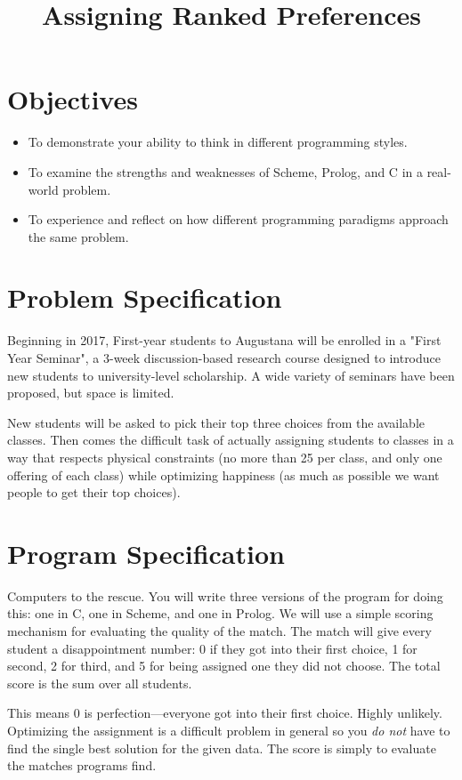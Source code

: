 \documentclass[12pt,info]{asg}
\title{Assigning Ranked Preferences}
\begin{document}
\maketitle
\section*{Objectives}
\begin{itemize}
\item To demonstrate your ability to think in different programming styles.
\item To examine the strengths and weaknesses of Scheme, Prolog, and C in a real-world problem.
\item To experience and reflect on how different programming paradigms approach the same problem.
\end{itemize}

\section*{Problem Specification}
Beginning in 2017, First-year students to Augustana will be enrolled in a "First Year Seminar", a 3-week discussion-based research course designed to introduce new students to university-level scholarship. A wide variety of seminars have been proposed, but space is limited.

New students will be asked to pick their top three choices from the available classes. Then comes the difficult task of actually assigning students to classes in a way that respects physical constraints (no more than 25 per class, and only one offering of each class) while optimizing happiness (as much as possible we want people to get their top choices).

\section*{Program Specification}
Computers to the rescue. You will write three versions of the program for doing this: one in C, one in Scheme, and one in Prolog. We will use a simple scoring mechanism for evaluating the quality of the match. The match will give every student a disappointment number: 0 if they got into their first choice, 1 for second, 2 for third, and 5 for being assigned one they did not choose. The total score is the sum over all students. 

This means 0 is perfection---everyone got into their first choice. Highly unlikely. Optimizing the assignment is a difficult problem in general so you {\em do not} have to find the single best solution for the given data. The score is simply to evaluate the matches programs find.
\end{document}
